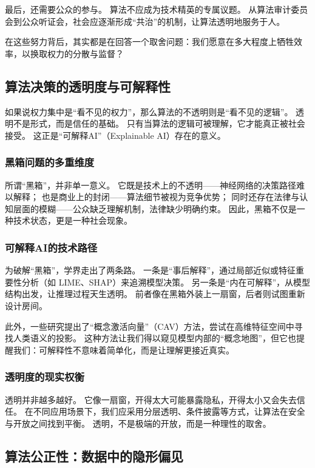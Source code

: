 最后，还需要公众的参与。  
算法不应成为技术精英的专属议题。  
从算法审计委员会到公众听证会，社会应逐渐形成“共治”的机制，让算法透明地服务于人。

在这些努力背后，其实都是在回答一个取舍问题：我们愿意在多大程度上牺牲效率，以换取权力的分散与监督？

\subsection{算法决策的透明度与可解释性}

如果说权力集中是“看不见的权力”，那么算法的不透明则是“看不见的逻辑”。
透明不是形式，而是信任的基础。
只有当算法的逻辑可被理解，它才能真正被社会接受。
 这正是“可解释AI”（Explainable AI）存在的意义。

\subsubsection{黑箱问题的多重维度}

所谓“黑箱”，并非单一意义。
它既是技术上的不透明——神经网络的决策路径难以解释；
也是商业上的封闭——算法细节被视为竞争优势；
同时还存在法律与认知层面的模糊——公众缺乏理解机制，法律缺少明确约束。
 因此，黑箱不仅是一种技术状态，更是一种社会现象。

\subsubsection{可解释AI的技术路径}

为破解“黑箱”，学界走出了两条路。  
一条是“事后解释”，通过局部近似或特征重要性分析（如 LIME、SHAP）来追溯模型决策。  
另一条是“内在可解释”，从模型结构出发，让推理过程天生透明。  
前者像在黑箱外装上一扇窗，后者则试图重新设计房间。

此外，一些研究提出了“概念激活向量”（CAV）方法，尝试在高维特征空间中寻找人类语义的投影。  
这种方法让我们得以窥见模型内部的“概念地图”，但它也提醒我们：可解释性不意味着简单化，而是让理解更接近真实。

\subsubsection{透明度的现实权衡}

透明并非越多越好。  
它像一扇窗，开得太大可能暴露隐私，开得太小又会失去信任。  
在不同应用场景下，我们应采用分层透明、条件披露等方式，让算法在安全与开放之间找到平衡。  
透明，不是极端的开放，而是一种理性的取舍。

\subsection{算法公正性：数据中的隐形偏见}

